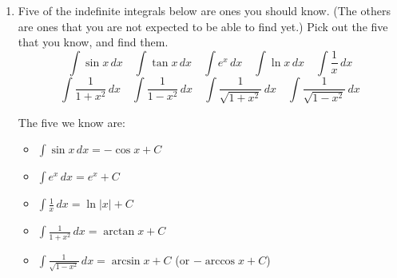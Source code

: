 \documentclass{article}
\begin{document}
\begin{enumerate}
\begin{enumerate}
    \pspace{\newpage}

  \item


    \begin{problem}[\vfill]
      Five of the indefinite integrals below are ones you should 
      know.  (The others are ones that you are not expected to be able to
      find yet.)  Pick out the five that you know, and find them.
      \[ \int \sin x\,dx \quad \int \tan x\,dx \quad \int e^x\,dx \quad \int
      \ln x\,dx \quad \int \frac{1}{x}\,dx \]
      \[ \int \frac{1}{1 + x^2}\,dx \quad \int \frac{1}{1 - x^2}\,dx \quad
      \int \frac{1}{\sqrt{1 + x^2}}\,dx \quad \int \frac{1}{\sqrt{1 -
          x^2}}\,dx \]
    \end{problem}

    \begin{solution}
      The five we know are:
      \begin{itemize}
      \item $\displaystyle \int \sin x\,dx = - \cos x + C$
      \item $\displaystyle \int e^x \,dx = e^x + C$
      \item $\displaystyle \int \frac{1}{x}\,dx = \ln |x| + C$
      \item $\displaystyle \int \frac{1}{1 + x^2}\,dx = \arctan x + C$
      \item $\displaystyle \int \frac{1}{\sqrt{1 - x^2}}\,dx = \arcsin x +
        C$ (or $-\arccos x + C$)
      \end{itemize}
    \end{solution}

  \end{enumerate}


\end{enumerate}

\spaceonly{\psreflection{}}
\end{document}
